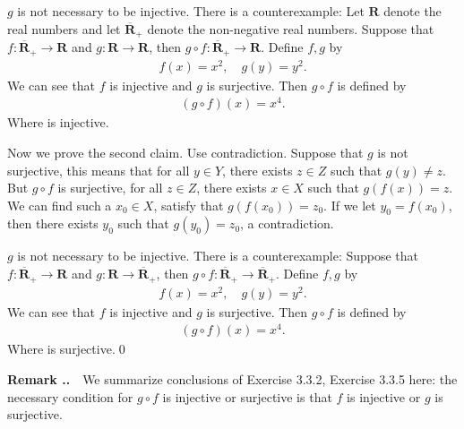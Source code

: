 \documentclass{book}
\newcommand{\remark}{\vspace{.5em}\noindent\textbf{Remark \textbf{\theExercise}}~~}
\newcounter{Exercise}[section]
\renewcommand{\theExercise}{\thesection.\arabic{Exercise}.}
\begin{document}
$g$ is not necessary to be injective. There is a counterexample: Let $\mathbf{R}$ denote the real numbers and let $\mathbf{\overline R}_+$ denote the non-negative real numbers. Suppose that $f:\mathbf{\overline R}_+\to\mathbf{R}$ and $g:\mathbf{R}\to\mathbf{R}$, then $g\circ f:\mathbf{\overline R}_+\to\mathbf{R}$. Define $f,g$ by
    \begin{align*}
        f(x)=x^2,\quad g(y)=y^2.
    \end{align*}
We can see that $f$ is injective and $g$ is surjective. Then $g\circ f$ is defined by
    \begin{align*}
        (g\circ f)(x)=x^4.
    \end{align*}
Where is injective.

\begin{comment}
Furthermore, we assume that $g$ is not injective. There exists $y,y'\in Y$ such that $g(y)=g(y')$ and $y\neq y'$. Let $y=f(x)$ and $y'=f(x')$. If $g(f(x))=g(f(x'))$ and $f(x)\neq f(x')$. Then $f(x)=f(x')\implies x=x'$ is vacuously true. So it is not necessary for $g\circ f$ is injective that $g$ is injective.
And we assume that $f$ is not surjective, this means for all $x\in X$, there exists $y\in Y$ such that $f(x)\neq y$. But this is vacuously true for $x\in X$. So it is not necessary for $g\circ f$ is injective that $g$ is injective.
\end{comment}
Now we prove the second claim. Use contradiction. Suppose that $g$ is not surjective, this means that for all $y\in Y$, there exists $z\in Z$ such that $g(y)\neq z$. But $g\circ f$ is surjective, for all $z\in Z$, there exists $x\in X$ such that $g(f(x))=z$. We can find such a $x_0\in X$, satisfy that $g(f(x_0))=z_0$. If we let $y_0=f(x_0)$, then there exists $y_0$ such that $g(y_0)=z_0$, a contradiction.

$g$ is not necessary to be injective. There is a counterexample: Suppose that $f:\mathbf{\overline R}_+\to\mathbf{R}$ and $g:\mathbf{R}\to\mathbf{\overline R}_+$, then $g\circ f:\mathbf{\overline R}_+\to\mathbf{\overline R}_+$. Define $f,g$ by
    \begin{align*}
        f(x)=x^2,\quad g(y)=y^2.
    \end{align*}
We can see that $f$ is injective and $g$ is surjective. Then $g\circ f$ is defined by
    \begin{align*}
        (g\circ f)(x)=x^4.
    \end{align*}
Where is surjective.\qed

\remark We summarize conclusions of Exercise 3.3.2, Exercise 3.3.5 here: the necessary condition for $g\circ f$ is injective or surjective is that $f$ is injective or $g$ is surjective.
\end{document}
